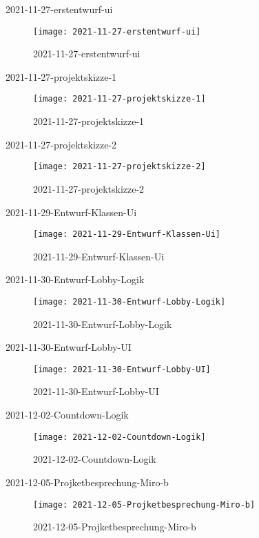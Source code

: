 2021-11-27-erstentwurf-ui 
\begin{figure}[H]
    \centering
    \caption[]{2021-11-27-erstentwurf-ui}
    \label{fig:2021-11-27-erstentwurf-ui}
    \texttt{[image: 2021-11-27-erstentwurf-ui]}
\end{figure}

2021-11-27-projektskizze-1 
\begin{figure}[H]
    \centering
    \caption[]{2021-11-27-projektskizze-1}
    \label{fig:2021-11-27-projektskizze-1}
    \texttt{[image: 2021-11-27-projektskizze-1]}
\end{figure}

2021-11-27-projektskizze-2 
\begin{figure}[H]
    \centering
    \caption[]{2021-11-27-projektskizze-2}
    \label{fig:2021-11-27-projektskizze-2}
    \texttt{[image: 2021-11-27-projektskizze-2]}
\end{figure}

2021-11-29-Entwurf-Klassen-Ui 
\begin{figure}[H]
    \centering
    \caption[]{2021-11-29-Entwurf-Klassen-Ui}
    \label{fig:2021-11-29-Entwurf-Klassen-Ui}
    \texttt{[image: 2021-11-29-Entwurf-Klassen-Ui]}
\end{figure}

2021-11-30-Entwurf-Lobby-Logik 
\begin{figure}[H]
    \centering
    \caption[]{2021-11-30-Entwurf-Lobby-Logik}
    \label{fig:2021-11-30-Entwurf-Lobby-Logik}
    \texttt{[image: 2021-11-30-Entwurf-Lobby-Logik]}
\end{figure}

2021-11-30-Entwurf-Lobby-UI 
\begin{figure}[H]
    \centering
    \caption[]{2021-11-30-Entwurf-Lobby-UI}
    \label{fig:2021-11-30-Entwurf-Lobby-UI}
    \texttt{[image: 2021-11-30-Entwurf-Lobby-UI]}
\end{figure}

2021-12-02-Countdown-Logik 
\begin{figure}[H]
    \centering
    \caption[]{2021-12-02-Countdown-Logik}
    \label{fig:2021-12-02-Countdown-Logik}
    \texttt{[image: 2021-12-02-Countdown-Logik]}
\end{figure}

2021-12-05-Projketbesprechung-Miro-b 
\begin{figure}[H]
    \centering
    \caption[]{2021-12-05-Projketbesprechung-Miro-b}
    \label{fig:2021-12-05-Projketbesprechung-Miro-b}
    \texttt{[image: 2021-12-05-Projketbesprechung-Miro-b]}
\end{figure}

